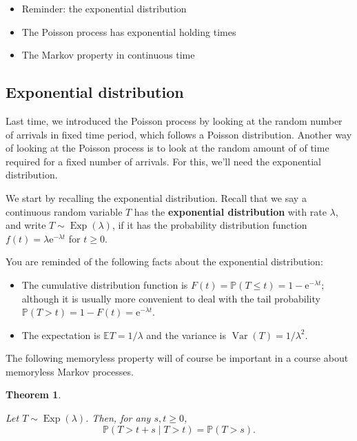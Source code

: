 \documentclass[
  a4paper,
]{article}
\providecommand{\tightlist}{%
  \setlength{\itemsep}{0pt}\setlength{\parskip}{0pt}}
\newtheorem{theorem}{Theorem}[section]
\theoremstyle{definition}
\theoremstyle{definition}
\theoremstyle{definition}
\theoremstyle{remark}
\begin{document}
\begin{itemize}
\tightlist
\item
  Reminder: the exponential distribution
\item
  The Poisson process has exponential holding times
\item
  The Markov property in continuous time
\end{itemize}

\newcommand{\Exp}{\operatorname{Exp}}

\hypertarget{exponential}{%
\subsection{Exponential distribution}\label{exponential}}

Last time, we introduced the Poisson process by looking at the random number of arrivals in fixed time period, which follows a Poisson distribution. Another way of looking at the Poisson process is to look at the random amount of of time required for a fixed number of arrivals. For this, we'll need the exponential distribution.

We start by recalling the exponential distribution.
Recall that we say a continuous random variable \(T\) has the \textbf{exponential distribution} with rate \(\lambda\), and write \(T \sim \operatorname{Exp}(\lambda)\), if it has the probability distribution function \(f(t) = \lambda \mathrm{e}^{-\lambda t}\) for \(t \geq 0\).

You are reminded of the following facts about the exponential distribution:

\begin{itemize}
\tightlist
\item
  The cumulative distribution function is \(F(t) = \mathbb P(T \leq t) = 1 - \mathrm{e}^{-\lambda t}\); although it is usually more convenient to deal with the tail probability \(\mathbb P(T > t) = 1 - F(t) = \mathrm{e}^{-\lambda t}\).
\item
  The expectation is \(\mathbb E T = 1/\lambda\) and the variance is \(\operatorname{Var}(T) = 1/\lambda^2\).
\end{itemize}

The following memoryless property will of course be important in a course about memoryless Markov processes.

\begin{theorem}
\protect\hypertarget{thm:memoryless-thm}{}\label{thm:memoryless-thm}

Let \(T \sim \operatorname{Exp}(\lambda)\). Then, for any \(s,t\geq0\),
\[ \mathbb P(T > t + s \mid T > t) = \mathbb P(T > s) . \]

\end{theorem}
\end{document}
